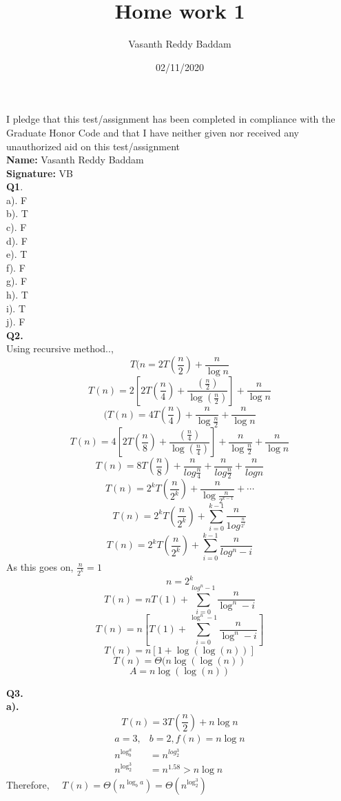 \documentclass[11pt]{article}
\title{Home work 1}
\author{Vasanth Reddy Baddam}
\date{02/11/2020}
\begin{document}
\maketitle
I pledge that this test/assignment has been completed in compliance with the Graduate Honor Code and
that I have neither given nor received any unauthorized aid on this test/assignment\\
\textbf{Name: } Vasanth Reddy Baddam\\
\textbf{Signature: } VB\\

\textbf{Q1}.\\
a). F\\
b). T\\
c). F\\
d). F\\
e). T\\
f). F \\
g). F\\
h). T\\
i). T\\
j). F\\
\hline
\vspace{5mm}
\textbf{Q2.}\\
\hspace*{3ex}Using recursive method..,\\
$$T(n=2 T\left(\frac{n}{2}\right)+\frac{n}{\log n}$$
$$T(n)=2\left[2 T\left(\frac{n}{4}\right)+\frac{\left(\frac{n}{2}\right)}{\log \left(\frac{n}{2}\right)}\right]+\frac{n}{\log n}$$
$$(T(n)=4 T\left(\frac{n}{4}\right)+\frac{n}{\log \frac{n}{2}}+\frac{n}{\log n}$$
$$T(n)=4\left[2 T\left(\frac{n}{8}\right)+\frac{\left(\frac{n}{4}\right)}{\log \left(\frac{n}{4}\right)}\right]+\frac{n}{\log \frac{n}{2}}+\frac{n}{\log n}$$
$$T(n)=8 T\left(\frac{n}{8}\right)+\frac{n}{log \frac{n}{4}}+\frac{n}{log \frac{n}{2}}+\frac{n}{log n}$$
$$T(n)=2^{k} T\left(\frac{n}{2^{k}}\right)+\frac{n}{\log \frac{n}{2^{k-1}}}+\cdots$$
$$T(n)=2^{k} T\left(\frac{n}{2^{k}}\right)+\sum_{i=0}^{k-1} \frac{n}{1og_{}^{\frac{n}{2^{i}}}}$$
$$T(n)={2^{k} T\left(\frac{n}{2^{k}}\right)+\sum_{i=0}^{k-1} \frac{n}{log^{n}-i}}$$
As this goes on, $\frac{n}{2^{k}} = 1 $
$$n = 2^{k}$$
$$T(n)=n T(1)+\sum_{i=0}^{log^{n} - 1} \frac{n}{\log^{n}-i}$$
$$T(n)=n\left[T(1)+\sum_{i=0}^{\log^{n} - 1} \frac{n}{\log ^{n}-i}\right]$$
$$T(n)= n[1+\log (\log (n))]$$
$$T(n) = \Theta(n\log(\log(n))$$
$$A = n\log(\log(n))$$
\hline

\vspace{5mm}
\textbf{Q3.}\\
\textbf{a).} \\
$$T(n)=3 T\left(\frac{n}{2}\right)+n \log n$$
$$
\begin{aligned}
a=3, & b=2, f(n)=n \log n \\
n^{\log _{b}^{a}} &=n^{log_{2}^{3}} \\
n^{\log _{2}^{3}} &=n^{1.58}>n \log n
\end{aligned}
$$
Therefore, \(\quad T(n)=\Theta\left(n^{\log _{b} a}\right)=\Theta\left(n^{\log _{2}^{3}}\right)\)
\end{document}
